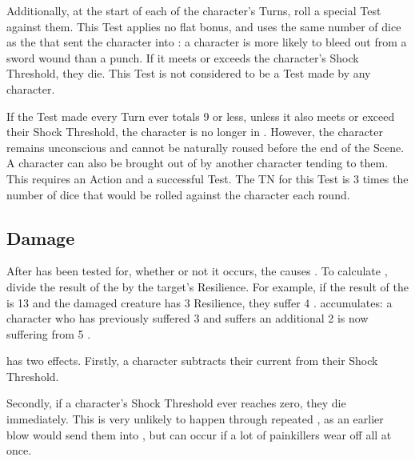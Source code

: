 Additionally, at the start of each of the  character's Turns, roll a special Test against them.
This Test applies no flat bonus, and uses the same number of dice as the  that sent the character into : a character is more likely to bleed out from a sword wound than a punch.
If it meets or exceeds the  character's Shock Threshold, they die.
This Test is not considered to be a Test made by any character.

If the Test made every Turn ever totals 9 or less, unless it also meets or exceed their Shock Threshold, the character is no longer in .
However, the character remains unconscious and cannot be naturally roused before the end of the Scene.
A character can also be brought out of  by another character tending to them.
This requires an Action and a successful  Test.
The TN for this Test is 3 times the number of dice that would be rolled against the  character each round.

\subsection{Damage}
\newcommand\damage{\seclink{Damage}{damage}}

After  has been tested for, whether or not it occurs, the  causes .
To calculate , divide the result of the  by the target's Resilience.
For example, if the result of the  is 13 and the damaged creature has 3 Resilience, they suffer 4 .
 accumulates: a character who has previously suffered 3  and suffers an additional 2 is now suffering from 5 .

 has two effects.
Firstly, a character subtracts their current  from their Shock Threshold.

Secondly, if a character's Shock Threshold ever reaches zero, they die immediately.
This is very unlikely to happen through repeated , as an earlier blow would send them into , but can occur if a lot of painkillers wear off all at once.

